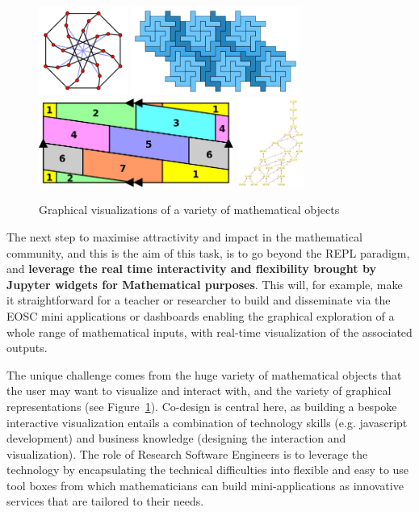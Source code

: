 \begin{figure}[h]
\begin{center}
    \includegraphics[height=2.9cm]{images/500px-McGee_graph}
    \includegraphics[height=2.9cm]{images/nonominoes}
    \includegraphics[height=2.9cm]{images/500px-Torus_with_seven_colours}
    \includegraphics[height=2.9cm]{images/359px-F4HassePoset}
  \end{center}
  \caption{Graphical visualizations of a variety of mathematical objects}
  \label{fig:math_viz}
\end{figure}

  The next step to maximise attractivity and impact in the
  mathematical community, and this is the aim of this task, is to go
  beyond the REPL paradigm, and \textbf{leverage the real time
    interactivity and flexibility brought by Jupyter widgets for
    Mathematical purposes}. This will, for example, make it straightforward for a teacher or
  researcher to build and disseminate via the EOSC mini applications
  or dashboards enabling the graphical exploration of a whole range of
  mathematical inputs, with real-time visualization of the associated
  outputs.

  The unique challenge comes from the huge variety of mathematical
  objects that the user may want to visualize and interact with, and
  the variety of graphical representations (see Figure~\ref{fig:math_viz}). Co-design is central here,
  as building a bespoke interactive visualization entails a
  combination of technology skills (e.g. javascript development) and
  business knowledge (designing the interaction and visualization).
  The role of Research Software Engineers is to leverage the
  technology by encapsulating the technical difficulties into flexible
  and easy to use tool boxes from which mathematicians can build
  mini-applications as innovative services that are tailored to their needs.

